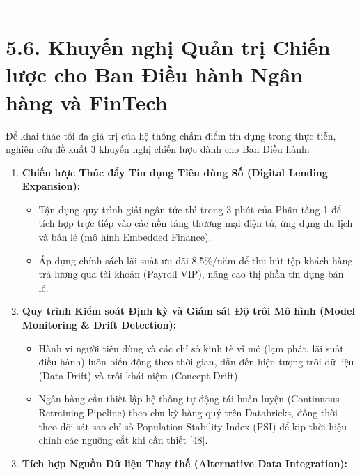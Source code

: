 \documentclass[
  13pt,
  a4paper,
]{report}
\providecommand{\tightlist}{%
  \setlength{\itemsep}{0pt}\setlength{\parskip}{0pt}}
\begin{document}
\begin{center}\rule{0.5\linewidth}{0.5pt}\end{center}

\section{5.6. Khuyến nghị Quản trị Chiến lược cho Ban Điều hành Ngân
hàng và
FinTech}\label{khuyux1ebfn-nghux1ecb-quux1ea3n-trux1ecb-chiux1ebfn-lux1b0ux1ee3c-cho-ban-ux111iux1ec1u-huxe0nh-nguxe2n-huxe0ng-vuxe0-fintech}

Để khai thác tối đa giá trị của hệ thống chấm điểm tín dụng trong thực
tiễn, nghiên cứu đề xuất 3 khuyến nghị chiến lược dành cho Ban Điều
hành:

\begin{enumerate}
\def\labelenumi{\arabic{enumi}.}
\tightlist
\item
  \textbf{Chiến lược Thúc đẩy Tín dụng Tiêu dùng Số (Digital Lending
  Expansion):}

  \begin{itemize}
  \tightlist
  \item
    Tận dụng quy trình giải ngân tức thì trong 3 phút của Phân tầng 1 để
    tích hợp trực tiếp vào các nền tảng thương mại điện tử, ứng dụng du
    lịch và bán lẻ (mô hình Embedded Finance).
  \item
    Áp dụng chính sách lãi suất ưu đãi 8.5\%/năm để thu hút tệp khách
    hàng trả lương qua tài khoản (Payroll VIP), nâng cao thị phần tín
    dụng bán lẻ.
  \end{itemize}
\item
  \textbf{Quy trình Kiểm soát Định kỳ và Giám sát Độ trôi Mô hình (Model
  Monitoring \& Drift Detection):}

  \begin{itemize}
  \tightlist
  \item
    Hành vi người tiêu dùng và các chỉ số kinh tế vĩ mô (lạm phát, lãi
    suất điều hành) luôn biến động theo thời gian, dẫn đến hiện tượng
    trôi dữ liệu (Data Drift) và trôi khái niệm (Concept Drift).
  \item
    Ngân hàng cần thiết lập hệ thống tự động tái huấn luyện (Continuous
    Retraining Pipeline) theo chu kỳ hàng quý trên Databricks, đồng thời
    theo dõi sát sao chỉ số Population Stability Index (PSI) để kịp thời
    hiệu chỉnh các ngưỡng cắt khi cần thiết {[}48{]}.
  \end{itemize}
\item
  \textbf{Tích hợp Nguồn Dữ liệu Thay thế (Alternative Data
  Integration):}


\end{enumerate}
\end{document}
